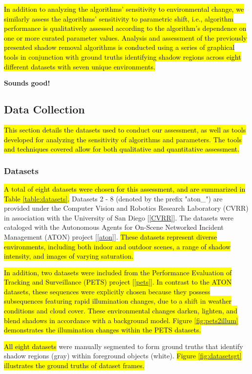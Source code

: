 \documentclass[12pt]{report}
\newcommand{\comment}[1]
           {\par {\bfseries \color{blue} #1 \par}}
\begin{document}
\hl{In addition to analyzing the algorithms' sensitivity to environmental change, we similarly assess the algorithms' sensitivity to parametric shift, i.e., algorithm performance is qualitatively assessed according to the algorithm's dependence on one or more curated parameter values. Analysis and assessment of the previously presented shadow removal algorithms is conducted using a series of graphical tools in conjunction with ground truths identifying shadow regions across eight different datasets with seven unique environments.}
\comment{Sounds good!}

\subsection{Data Collection}  \label{section:datacollection}

\hl{This section details the datasets used to conduct our assessment, as well as tools developed for analyzing the sensitivity of algorithms and parameters. The tools and techniques covered allow for both qualitative and quantitative assessment.}

\subsubsection{Datasets}
\hl{A total of eight datasets were chosen for this assessment, and are summarized in Table \ref{table:datasets}.} Datasets 2 - 8 (denoted by the prefix "aton\_") are provided under the Computer Vision and Robotics Research Laboratory (CVRR) in association with the University of San Diego [\ref{CVRR}]. The datasets were cataloged with the Autonomous Agents for On-Scene Networked Incident Management (ATON) project [\ref{aton}]. \hl{These datasets represent diverse environments, including both indoor and outdoor scenes, a range of shadow intensity, and images of varying saturation.}

\hl{In addition, two datasets were included from the Performance Evaluation of Tracking and Surveillance (PETS) project [\ref{pets}]. In contrast to the ATON datasets, these sequences were explicitly chosen because they possess subsequences featuring rapid illumination changes, due to a shift in weather conditions and cloud cover. These environmental changes darken, lighten, and blend shadows in accordance with a background model. Figure \ref{fig:pets2illum} demonstrates the illumination changes within the PETS datasets.}

\hl{All eight datasets} were manually segmented to form ground truths that identify shadow regions (gray) within foreground objects (white). \hl{Figure \ref{fig:datasetsgt} illustrates the ground truths of dataset frames.}
\end{document}
